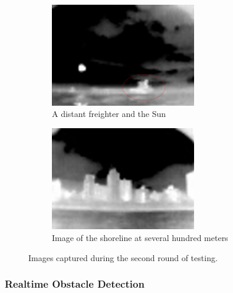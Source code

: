 \begin{figure}
\centering
\begin{subfigure}{0.45\textwidth}
 \centering
 \includegraphics[width=0.7\textwidth]{"./image/FreighterSun_circled"}
 \caption{A distant freighter and the Sun}
 \label{fig:testround2:sub1}
\end{subfigure}
\begin{subfigure}{0.45\textwidth}
 \centering
 \includegraphics[width=0.7\textwidth]{"./image/Land"}
 \caption{Image of the shoreline at several hundred meters}
 \label{fig:testround2:sub2}
\end{subfigure}
\caption{Images captured during the second round of testing.}
\label{fig:testround2}
\end{figure}


\subsubsection{\label{sec:discussion:results:realtimeDetection}Realtime Obstacle Detection}


